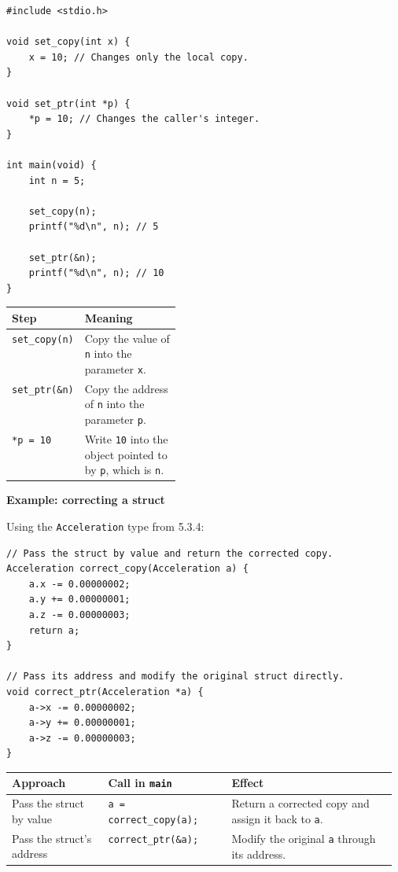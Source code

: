 \documentclass[11pt,a4paper]{article}
\begin{document}
\begin{lstlisting}[style=cscode,
    morekeywords={[2]{set_copy,set_ptr}}]
#include <stdio.h>

void set_copy(int x) {
    x = 10; // Changes only the local copy.
}

void set_ptr(int *p) {
    *p = 10; // Changes the caller's integer.
}

int main(void) {
    int n = 5;

    set_copy(n);
    printf("%d\n", n); // 5

    set_ptr(&n);
    printf("%d\n", n); // 10
}
\end{lstlisting}

\begin{longtable}{@{}
    >{\raggedright\arraybackslash}p{0.25\linewidth}
    >{\raggedright\arraybackslash}p{}@{}}
\toprule
\textbf{Step} & \textbf{Meaning} \\
\midrule
\endhead
\bottomrule
\endlastfoot
\texttt{set\_copy(n)}
    & Copy the value of \texttt{n} into the parameter
      \texttt{x}. \\
\texttt{set\_ptr(\&n)}
    & Copy the address of \texttt{n} into the parameter
      \texttt{p}. \\
\texttt{*p = 10}
    & Write \texttt{10} into the object pointed to by
      \texttt{p}, which is \texttt{n}. \\
\end{longtable}

\textbf{Example: correcting a struct}

Using the \texttt{Acceleration} type from 5.3.4:

\begin{lstlisting}[style=cscode,
    morekeywords={[2]{correct_copy,correct_ptr}},
    morekeywords={[3]{Acceleration}}]
// Pass the struct by value and return the corrected copy.
Acceleration correct_copy(Acceleration a) {
    a.x -= 0.00000002;
    a.y += 0.00000001;
    a.z -= 0.00000003;
    return a;
}

// Pass its address and modify the original struct directly.
void correct_ptr(Acceleration *a) {
    a->x -= 0.00000002;
    a->y += 0.00000001;
    a->z -= 0.00000003;
}
\end{lstlisting}

\begin{longtable}{@{}
    >{\raggedright\arraybackslash}p{0.25\linewidth}
    >{\raggedright\arraybackslash}p{0.32\linewidth}
    >{\raggedright\arraybackslash}p{}@{}}
\toprule
\textbf{Approach} & \textbf{Call in \texttt{main}} &
\textbf{Effect} \\
\midrule
\endhead
\bottomrule
\endlastfoot
Pass the struct by value
    & \texttt{a = correct\_copy(a);}
    & Return a corrected copy and assign it back to
      \texttt{a}. \\
Pass the struct's address
    & \texttt{correct\_ptr(\&a);}
    & Modify the original \texttt{a} through its address. \\
\end{longtable}
\end{document}
